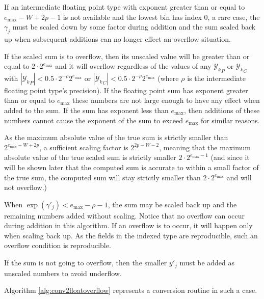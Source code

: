     If an intermediate floating point type with exponent greater than or equal
    to $e_{\max} - W + 2  p - 1$ is not available and the lowest bin has index
    0, a rare case, the $\gamma_j$ must be scaled down by some factor during
    addition and the sum scaled back up when subsequent additions can no longer
    effect an overflow situation.

    If the scaled sum is to overflow, then its unscaled value will be greater
    than or equal to $2 \cdot 2^{e_{\max}}$ and it will overflow regardless of
    the values of any ${\mathcal{Y}_k}_P$ or ${\mathcal{Y}_k}_C$ with
    $|{\mathcal{Y}_k}_P| < 0.5 \cdot 2^{-\rho} 2^{e_{\max}}$ or
    $|{\mathcal{Y}_k}_C| < 0.5 \cdot 2^{-\rho}2^{e_{\max}}$ (where $\rho$ is
    the intermediate floating point type's precision). If the floating point
    sum has exponent greater than or equal to $e_{\max}$ these numbers are not
    large enough to have any effect when added to the sum. If the sum has
    exponent less than $e_{\max}$, then additions of these numbers cannot cause
    the exponent of the sum to exceed $e_{\max}$ for similar reasons.

    As the maximum absolute value of the true sum is strictly smaller than
    $2^{e_{\max} - W + 2 p}$, a sufficient scaling factor is $2^{2p-W-2}$,
    meaning that the maximum absolute value of the true scaled sum is
    strictly smaller $2 \cdot 2^{e_{\max} - 1}$ (and since it will be shown
    later that the computed sum is accurate to within a small factor of the
    true sum, the computed sum will stay strictly smaller than $2 \cdot
    2^{e_{\max}}$ and will not overflow.)

    When $\exp(\gamma'_j) < e_{\max} - \rho - 1$, the sum may be scaled back up
    and the remaining numbers added without scaling. Notice that no overflow
    can occur during addition in this algorithm. If an overflow is to occur, it
    will happen only when scaling back up. As the fields in the indexed type
    are reproducible, such an overflow condition is reproducible.

    If the sum is not going to overflow, then the smaller $y'_j$ must be added
    as unscaled numbers to avoid underflow.

    Algorithm \ref{alg:conv2floatoverflow} represents a conversion routine in such a case.

